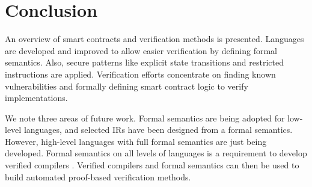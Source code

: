 \section{Conclusion}
\label{conclusion}
An overview of smart contracts and verification methods is presented.
Languages are developed and improved to allow easier verification by defining formal semantics. Also, secure patterns like explicit state transitions and restricted instructions are applied. Verification efforts concentrate on finding known vulnerabilities and formally defining smart contract logic to verify implementations.

We note three areas of future work. Formal semantics are being adopted for low-level languages, and selected IRs have been designed from a formal semantics. However, high-level languages with full formal semantics are just being developed.
Formal semantics on all levels of languages is a requirement to develop verified compilers \cite{Hirai2017}. Verified compilers and formal semantics can then be used to build automated proof-based verification methods.


